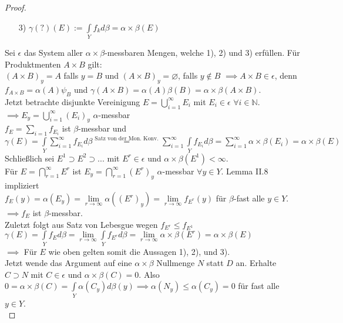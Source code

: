 \begin{proof}
\begin{itemize}
   		\item[3)] $\gamma (?) (E) := \int\limits_Y f_k d\beta = \alpha\times\beta (E)$
   	\end{itemize}
   Sei $\epsilon$ das System aller $\alpha\times\beta$-messbaren Mengen, welche 1), 2) und 3) erfüllen. Für Produktmenten $A\times B$ gilt: \\
   $(A\times B)_y = A$ falls $y=B$ und $(A\times B)_y = \varnothing$, falls $y\notin B$ $\implies A\times B \in \epsilon$, denn $f_{A\times B} = \alpha (A)\psi_B$ und $\gamma(A\times B) = \alpha(A) \beta(B) = \alpha\times\beta(A\times B)$. \\
   Jetzt betrachte disjunkte Vereinigung $E = \bigcup\limits_{i=1}^\infty E_i$ mit $E_i \in \epsilon$ $\forall i\in \mathbb{N}$. \\
   $\implies E_y = \bigcup\limits_{i=1}^\infty (E_i)_y$ $\alpha$-messbar \\
   $f_E = \sum\limits_{i=1}f_{E_i}$ ist $\beta$-messbar und \\
   $\gamma(E) = \int\limits_Y \sum\limits_{i=1}^\infty f_{E_i} d\beta \overset{\text{Satz von der Mon. Konv.}}{=} \sum\limits_{i=1}^\infty \int\limits_Y f_{E_i} d\beta = \sum\limits_{i=1}^\infty \alpha\times\beta(E_i) = \alpha\times\beta(E)$ \\
   Schließlich sei $E^1 \supset E^2 \supset ...$ mit $E^r \in \epsilon$ und $\alpha\times\beta(E^1) < \infty$. \\
   Für $E = \bigcap\limits_{r=1}^\infty E^r$ ist $E_y = \bigcap_{r=1}^\infty (E^r)_y$ $\alpha$-messbar $\forall y\in Y$. Lemma II.8 impliziert \\
   $f_E(y) = \alpha (E_y) = \lim\limits_{r\to\infty} \alpha((E^r)_y) = \lim\limits_{r\to\infty} f_{E^r}(y)$ für $\beta$-fast alle $y\in Y$. \\
   $\implies f_E$ ist $\beta$-messbar. \\
   Zuletzt folgt aus Satz von Lebesgue wegen $f_{E^r} \leq f_{E^1}$ \\
   $\gamma(E) = \int\limits_Y f_E d\beta = \lim\limits_{r\to\infty} \int\limits_Y f_{E^r} d\beta = \lim\limits_{r\to\infty}\alpha\times\beta(E^r) = \alpha\times\beta(E)$ \\
   $\implies$ Für $E$ wie oben gelten somit die Aussagen 1), 2), und 3). \\
   Jetzt wende das Argument auf eine $\alpha\times\beta$ Nullmenge $N$ statt $D$ an. Erhalte $C\supset N$ mit $C\in\epsilon$ und $\alpha\times\beta(C) = 0$. Also \\
   $0 = \alpha\times\beta(C) = \int\limits_Y \alpha(C_y)d\beta(y) \implies \alpha(N_y) \leq \alpha(C_y) = 0$ für fast alle $y\in Y$. \\

\end{proof}
